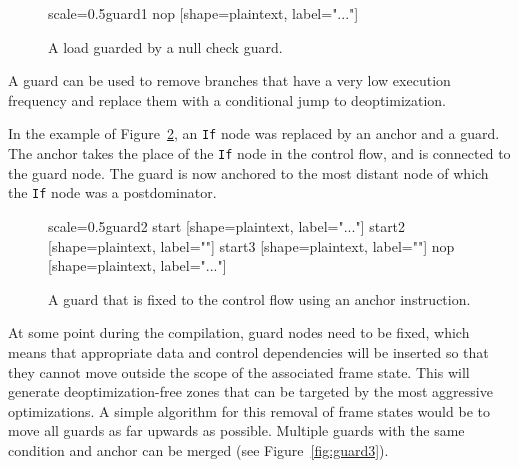 \documentclass[twocolumn]{svjour3}
\begin{document}
\begin{figure}[h]
  \centering
\begin{digraphenv}{scale=0.5}{guard1}
    nop [shape=plaintext, label="..."]
\end{digraphenv}
  \caption{A load guarded by a null check guard.}
  \label{fig:guard1}
\end{figure}

A guard can be used to remove branches that have a very low execution frequency and replace them with a conditional jump to deoptimization.

In the example of Figure~\ref{fig:guard2}, an \texttt{If} node was replaced by an anchor and a guard.
The anchor takes the place of the \texttt{If} node in the control flow, and is connected to the guard node.
The guard is now anchored to the most distant node of which the \texttt{If} node was a postdominator.

\begin{figure}[h]
  \centering
\begin{digraphenv}{scale=0.5}{guard2}
    start [shape=plaintext, label="..."]
    start2 [shape=plaintext, label=""]
    start3 [shape=plaintext, label=""]
    nop [shape=plaintext, label="..."]
\end{digraphenv}
  \caption{A guard that is fixed to the control flow using an anchor instruction.}
  \label{fig:guard2}
\end{figure}

At some point during the compilation, guard nodes need to be fixed, which means that appropriate data and control dependencies will be inserted so that they cannot move outside the scope of the associated frame state.
This will generate deoptimization-free zones that can be targeted by the most aggressive optimizations.
A simple algorithm for this removal of frame states would be to move all guards as far upwards as possible.
Multiple guards with the same condition and anchor can be merged (see Figure~\ref{fig:guard3}).
\end{document}
